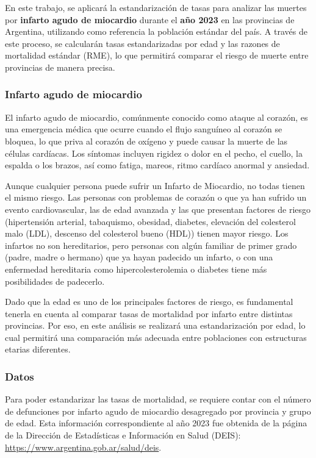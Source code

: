 \documentclass[
]{article}
\begin{document}
En este trabajo, se aplicará la estandarización de tasas para analizar
las muertes por \textbf{infarto agudo de miocardio} durante el
\textbf{año 2023} en las provincias de Argentina, utilizando como
referencia la población estándar del país. A través de este proceso, se
calcularán tasas estandarizadas por edad y las razones de mortalidad
estándar (RME), lo que permitirá comparar el riesgo de muerte entre
provincias de manera precisa.

\subsubsection{Infarto agudo de
miocardio}\label{infarto-agudo-de-miocardio}

El infarto agudo de miocardio, comúnmente conocido como ataque al
corazón, es una emergencia médica que ocurre cuando el flujo sanguíneo
al corazón se bloquea, lo que priva al corazón de oxígeno y puede causar
la muerte de las células cardíacas. Los síntomas incluyen rigidez o
dolor en el pecho, el cuello, la espalda o los brazos, así como fatiga,
mareos, ritmo cardíaco anormal y ansiedad.

Aunque cualquier persona puede sufrir un Infarto de Miocardio, no todas
tienen el mismo riesgo. Las personas con problemas de corazón o que ya
han sufrido un evento cardiovascular, las de edad avanzada y las que
presentan factores de riesgo (hipertensión arterial, tabaquismo,
obesidad, diabetes, elevación del colesterol malo (LDL), descenso del
colesterol bueno (HDL)) tienen mayor riesgo. Los infartos no son
hereditarios, pero personas con algún familiar de primer grado (padre,
madre o hermano) que ya hayan padecido un infarto, o con una enfermedad
hereditaria como hipercolesterolemia o diabetes tiene más posibilidades
de padecerlo.

Dado que la edad es uno de los principales factores de riesgo, es
fundamental tenerla en cuenta al comparar tasas de mortalidad por
infarto entre distintas provincias. Por eso, en este análisis se
realizará una estandarización por edad, lo cual permitirá una
comparación más adecuada entre poblaciones con estructuras etarias
diferentes.

\subsubsection{Datos}\label{datos}

Para poder estandarizar las tasas de mortalidad, se requiere contar con
el número de defunciones por infarto agudo de miocardio desagregado por
provincia y grupo de edad. Esta información correspondiente al año 2023
fue obtenida de la página de la Dirección de Estadísticas e Información
en Salud (DEIS): \url{https://www.argentina.gob.ar/salud/deis}.
\end{document}
